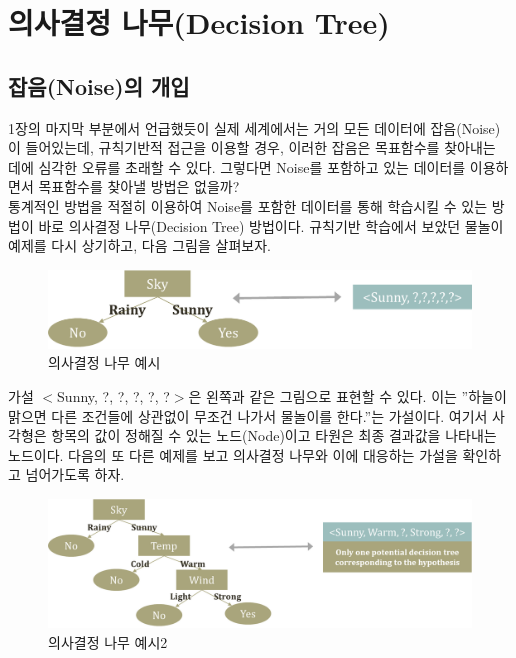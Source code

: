 \documentclass[a4paper]{oblivoir}
\begin{document}
\section{의사결정 나무(Decision Tree)}

\subsection{잡음(Noise)의 개입}
1장의 마지막 부분에서 언급했듯이 실제 세계에서는 거의 모든 데이터에 잡음(Noise)이 들어있는데, 규칙기반적 접근을 이용할 경우, 이러한 잡음은 목표함수를 찾아내는 데에 심각한 오류를 초래할 수 있다. 그렇다면 Noise를 포함하고 있는 데이터를 이용하면서 목표함수를 찾아낼 방법은 없을까? \\
\indent 통계적인 방법을 적절히 이용하여 Noise를 포함한 데이터를 통해 학습시킬 수 있는 방법이 바로 의사결정 나무(Decision Tree) 방법이다. 규칙기반 학습에서 보았던 물놀이 예제를 다시 상기하고, 다음 그림을 살펴보자. \\
\begin{figure}[ht]
\centering
\includegraphics[scale=0.5]{Decision_Tree1.png}
\caption{의사결정 나무 예시}
\label{Figure 2-11}
\end{figure}
\indent 가설 $<$Sunny, ?, ?, ?, ?, ?$>$은 왼쪽과 같은 그림으로 표현할 수 있다. 이는 ''하늘이 맑으면 다른 조건들에 상관없이 무조건 나가서 물놀이를 한다.''는 가설이다. 여기서 사각형은 항목의 값이 정해질 수 있는 노드(Node)이고 타원은 최종 결과값을 나타내는 노드이다. 다음의 또 다른 예제를 보고 의사결정 나무와 이에 대응하는 가설을 확인하고 넘어가도록 하자.
\begin{figure}[ht]
\centering
\includegraphics[scale=0.6]{Decision_Tree2.png}
\caption{의사결정 나무 예시2}
\label{Figure 2-12}
\end{figure}

\end{document}
